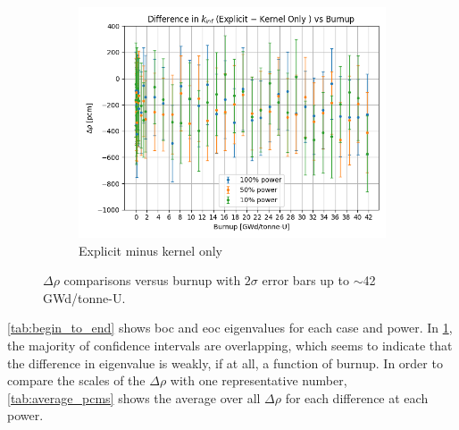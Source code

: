\documentclass[letterpaper]{physor2024}
\begin{document}
\begin{figure}[!h]
\begin{subfigure}{0.495\linewidth}
        \includegraphics[width=\linewidth]{figures/explicit_minus_kern.png}
        \caption{Explicit minus kernel only}
    \end{subfigure}
    \caption{$\Delta \rho$ comparisons versus burnup with $2\sigma$ error bars up to $\sim$42 GWd/tonne-U.}
    \label{fig:pcm_diffs}
\end{figure}

\cref{tab:begin_to_end} shows \gls{boc} and \gls{eoc} eigenvalues for each case and power. In \cref{fig:pcm_diffs}, the majority of confidence intervals are overlapping, which seems to indicate that the difference in eigenvalue is weakly, if at all, a function of burnup. In order to compare the scales of the $\Delta \rho$ with one representative number, \cref{tab:average_pcms} shows the average over all $\Delta \rho$ for each difference at each power.
\end{document}
